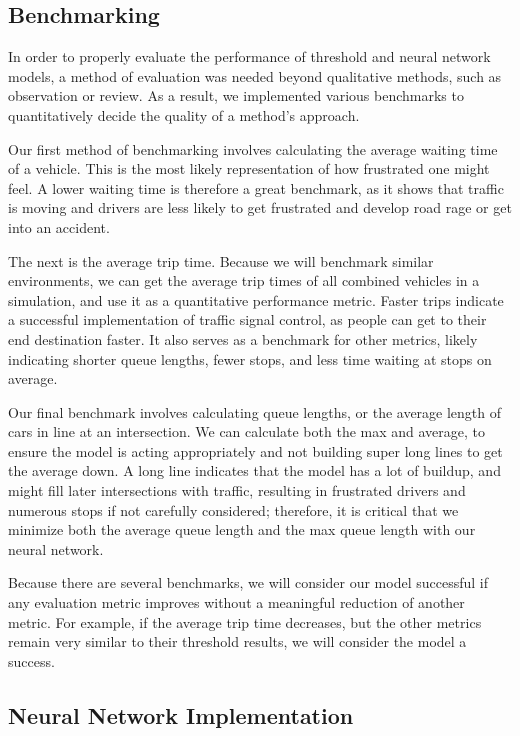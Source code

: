 \documentclass[conference]{IEEEtran}
\begin{document}
\subsection{Benchmarking}

In order to properly evaluate the performance of threshold and neural network models, a method of evaluation was needed beyond qualitative methods, such as observation or review. As a result, we implemented various benchmarks to quantitatively decide the quality of a method's approach. 

Our first method of benchmarking involves calculating the average waiting time of a vehicle. This is the most likely representation of how frustrated one might feel. A lower waiting time is therefore a great benchmark, as it shows that traffic is moving and drivers are less likely to get frustrated and develop road rage or get into an accident. 

The next is the average trip time. Because we will benchmark similar environments, we can get the average trip times of all combined vehicles in a simulation, and use it as a quantitative performance metric. Faster trips indicate a successful implementation of traffic signal control, as people can get to their end destination faster. It also serves as a benchmark for other metrics, likely indicating shorter queue lengths, fewer stops, and less time waiting at stops on average. 

Our final benchmark involves calculating queue lengths, or the average length of cars in line at an intersection. We can calculate both the max and average, to ensure the model is acting appropriately and not building super long lines to get the average down. A long line indicates that the model has a lot of buildup, and might fill later intersections with traffic, resulting in frustrated drivers and numerous stops if not carefully considered; therefore, it is critical that we minimize both the average queue length and the max queue length with our neural network. 

Because there are several benchmarks, we will consider our model successful if any evaluation metric improves without a meaningful reduction of another metric. For example, if the average trip time decreases, but the other metrics remain very similar to their threshold results, we will consider the model a success.

\subsection{Neural Network Implementation}
\end{document}
